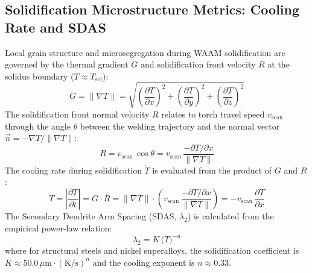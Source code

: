 \documentclass[10pt,a4paper]{article}
\begin{document}
\subsection{Solidification Microstructure Metrics: Cooling Rate and SDAS}
Local grain structure and microsegregation during WAAM solidification are governed by the thermal gradient $G$ and solidification front velocity $R$ at the solidus boundary ($T \approx T_{\mathrm{sol}}$):
\begin{equation}
G = \|\nabla T\| = \sqrt{\left(\frac{\partial T}{\partial x}\right)^2 + \left(\frac{\partial T}{\partial y}\right)^2 + \left(\frac{\partial T}{\partial z}\right)^2}
\end{equation}
The solidification front normal velocity $R$ relates to torch travel speed $v_{\mathrm{scan}}$ through the angle $\theta$ between the welding trajectory and the normal vector $\vec{n} = -\nabla T / \|\nabla T\|$:
\begin{equation}
R = v_{\mathrm{scan}}\,\cos\theta = v_{\mathrm{scan}}\,\frac{-\partial T / \partial x}{\|\nabla T\|}
\end{equation}
The cooling rate during solidification $\dot{T}$ is evaluated from the product of $G$ and $R$:
\begin{equation}
\dot{T} = \left|\frac{\partial T}{\partial t}\right| = G \cdot R = \|\nabla T\| \cdot \left(v_{\mathrm{scan}}\,\frac{-\partial T / \partial x}{\|\nabla T\|}\right) = -v_{\mathrm{scan}}\,\frac{\partial T}{\partial x}
\end{equation}
The Secondary Dendrite Arm Spacing (SDAS, $\lambda_2$) is calculated from the empirical power-law relation:
\begin{equation}
\lambda_2 = K\,\bigl(\dot{T}\bigr)^{-n}
\end{equation}
where for structural steels and nickel superalloys, the solidification coefficient is $K \approx 50.0\,\mu\mathrm{m}\cdot(\mathrm{K/s})^n$ and the cooling exponent is $n \approx 0.33$.
\end{document}
